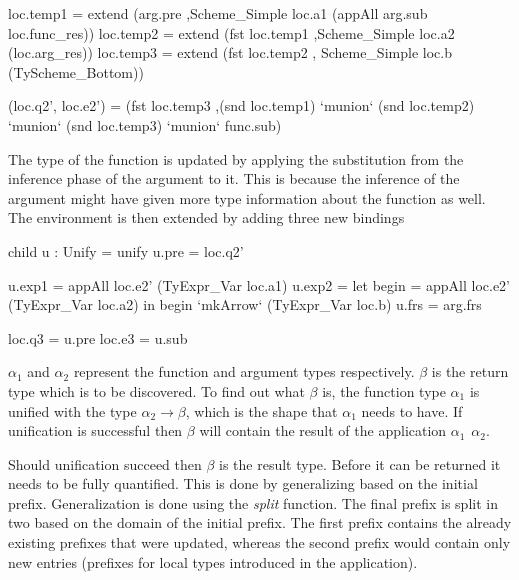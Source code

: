\begin{code}
loc.temp1 = extend (arg.pre
                   ,Scheme_Simple loc.a1 (appAll arg.sub loc.func_res))
loc.temp2 = extend (fst loc.temp1
                   ,Scheme_Simple loc.a2 (loc.arg_res))
loc.temp3 = extend (fst loc.temp2
                   , Scheme_Simple loc.b  (TyScheme_Bottom))
    
(loc.q2', loc.e2') 
   = (fst loc.temp3
     ,(snd loc.temp1) `munion` (snd loc.temp2) `munion` (snd loc.temp3) `munion` func.sub)
\end{code}
The type of the function is updated by applying the substitution from the inference phase of the argument to it. This is because the inference of the argument might have given more type information about the function as well. The environment is then extended by adding three new bindings 

\begin{code}
child u : Unify = unify
u.pre   = loc.q2'
       
u.exp1  = appAll loc.e2' (TyExpr_Var loc.a1)
u.exp2  =  let begin = appAll loc.e2' (TyExpr_Var loc.a2)
           in begin `mkArrow` (TyExpr_Var loc.b)
u.frs   = arg.frs
       
loc.q3  = u.pre
loc.e3  = u.sub
\end{code}
$\alpha_1$ and $\alpha_2$ represent the function and argument types respectively. $\beta$ is the return type which is to be discovered. To find out what $\beta$ is, the function type $\alpha_1$ is unified with the type $\alpha_2 \rightarrow \beta$, which is the shape that $\alpha_1$ needs to have. If unification is successful then $\beta$ will contain the result of the application $\alpha_1 \hspace{5pt} \alpha_2$.


Should unification succeed then $\beta$ is the result type. Before it can be returned it needs to be fully quantified. This is done by generalizing based on the initial prefix. Generalization is done using the \emph{split} function. The final prefix is split in two based on the domain of the initial prefix. The first prefix contains the already existing prefixes that were updated, whereas the second prefix would contain only new entries (prefixes for local types introduced in the application).

